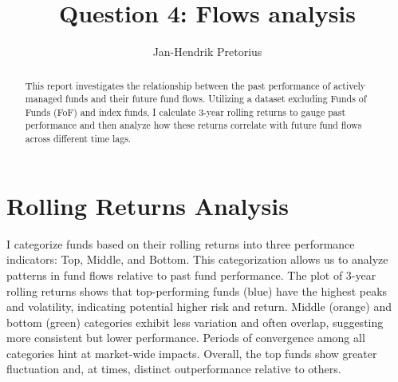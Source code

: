\documentclass[11pt,preprint, authoryear]{elsarticle}
\numberwithin{equation}{section}
\numberwithin{figure}{section}
\numberwithin{table}{section}
\begin{document}
\begin{frontmatter}  %

\title{Question 4: Flows analysis}





\author[Add1]{Jan-Hendrik Pretorius}





\address[Add1]{Stellenbosch University}


\begin{abstract}
\small{
This report investigates the relationship between the past performance
of actively managed funds and their future fund flows. Utilizing a
dataset excluding Funds of Funds (FoF) and index funds, I calculate
3-year rolling returns to gauge past performance and then analyze how
these returns correlate with future fund flows across different time
lags.
}
\end{abstract}

\vspace{1cm}





\vspace{0.5cm}

\end{frontmatter}

\setcounter{footnote}{0}



\pagestyle{fancy}
\chead{}
\lfoot{}
\lhead{}
\cfoot{}


\headsep 35pt %




\hypertarget{rolling-returns-analysis}{%
\section{Rolling Returns Analysis}\label{rolling-returns-analysis}}

I categorize funds based on their rolling returns into three performance
indicators: Top, Middle, and Bottom. This categorization allows us to
analyze patterns in fund flows relative to past fund performance. The
plot of 3-year rolling returns shows that top-performing funds (blue)
have the highest peaks and volatility, indicating potential higher risk
and return. Middle (orange) and bottom (green) categories exhibit less
variation and often overlap, suggesting more consistent but lower
performance. Periods of convergence among all categories hint at
market-wide impacts. Overall, the top funds show greater fluctuation
and, at times, distinct outperformance relative to others.
\end{document}
